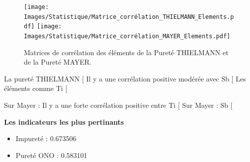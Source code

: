 \documentclass[12pt]{article}
\begin{document}






\begin{figure}[H]
    \centering
    \begin{adjustbox}{width=1.3\textwidth,center}
        \texttt{[image: Images/Statistique/Matrice\_corrélation\_THIELMANN\_Elements.pdf]}
        \texttt{[image: Images/Statistique/Matrice\_corrélation\_MAYER\_Elements.pdf]}
    \end{adjustbox}
    \caption{Matrices de corrélation des éléments de la Pureté THIELMANN et de la Pureté MAYER.}
    \label{fig:correlations}
\end{figure}


La pureté THIELMANN [%
Il y a une corrélation positive modérée avec Sb [%
Les éléments comme Ti [%

Sur Mayer : Il y a une forte corrélation positive entre Ti [%
Sur Mayer : Sb [%






\textbf{Les indicateurs les plus pertinants}
\begin{itemize}
\item Impureté : 0.673506
\item Pureté ONO : 0.583101
\end{itemize}
\end{document}

